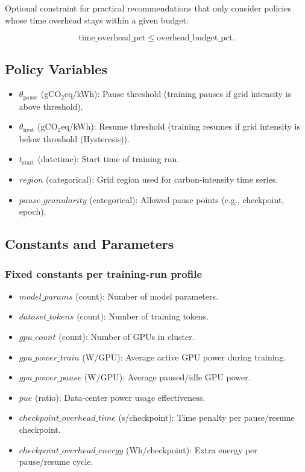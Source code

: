 Optional constraint for practical recommendations that only consider policies whose time overhead stays within a given budget:

\[
  \text{time\_overhead\_pct} \leq \text{overhead\_budget\_pct}.
\]

\subsection{Policy Variables}

\begin{itemize}
  \item $\theta_{\text{pause}}$ (gCO$_2$eq/kWh): Pause threshold (training pauses if grid intensity is above threshold).
  \item $\theta_{\text{hyst}}$ (gCO$_2$eq/kWh): Resume threshold (training resumes if grid intensity is below threshold (Hysteresis)).
  \item $t_{\text{start}}$ (datetime): Start time of training run.
  \item $\mathit{region}$ (categorical): Grid region used for carbon-intensity time series.
  \item $\mathit{pause\_granularity}$ (categorical): Allowed pause points (e.g., checkpoint, epoch).
\end{itemize}

\subsection{Constants and Parameters}

\subsubsection{Fixed constants per training-run profile}

\begin{itemize}
  \item $\mathit{model\_params}$ (count): Number of model parameters.
  \item $\mathit{dataset\_tokens}$ (count): Number of training tokens.
  \item $\mathit{gpu\_count}$ (count): Number of GPUs in cluster.
  \item $\mathit{gpu\_power\_train}$ (W/GPU): Average active GPU power during training.
  \item $\mathit{gpu\_power\_pause}$ (W/GPU): Average paused/idle GPU power.
  \item $\mathit{pue}$ (ratio): Data-center power usage effectiveness.
  \item $\mathit{checkpoint\_overhead\_time}$ (s/checkpoint): Time penalty per pause/resume checkpoint.
  \item $\mathit{checkpoint\_overhead\_energy}$ (Wh/checkpoint): Extra energy per pause/resume cycle.
\end{itemize}

